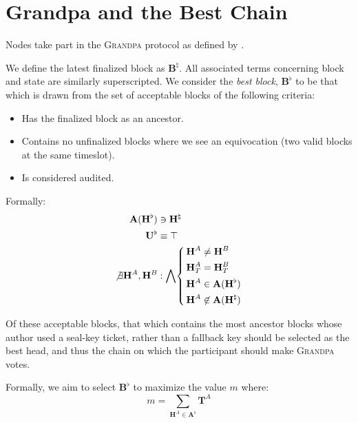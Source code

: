 \section{Grandpa and the Best Chain}\label{sec:bestchain}\label{sec:grandpa}

Nodes take part in the \textsc{Grandpa} protocol as defined by \cite{stewart2020grandpa}.

\newcommand{\final}{\natural}
\newcommand{\best}{\flat}

We define the latest finalized block as $\mathbf{B}^\final$. All associated terms concerning block and state are similarly superscripted. We consider the \emph{best block}, $\mathbf{B}^\best$ to be that which is drawn from the set of acceptable blocks of the following criteria:

\begin{itemize}
  \item Has the finalized block as an ancestor.
  \item Contains no unfinalized blocks where we see an equivocation (two valid blocks at the same timeslot).
  \item Is considered audited.
\end{itemize}

Formally:
\begin{align}
  \mathbf{A}(\mathbf{H}^\best) &\owns \mathbf{H}^\final \\
  \mathbf{U}^\best &\equiv \top \\
  \not\exists \mathbf{H}^A, \mathbf{H}^B &: \bigwedge \left\{\,\begin{aligned}
    \mathbf{H}^A &\ne \mathbf{H}^B \\
    \mathbf{H}^A_T &= \mathbf{H}^B_T \\
    \mathbf{H}^A &\in \mathbf{A}(\mathbf{H}^\best) \\
    \mathbf{H}^A &\not\in \mathbf{A}(\mathbf{H}^\final)
  \end{aligned}\right.
\end{align}

Of these acceptable blocks, that which contains the most ancestor blocks whose author used a seal-key ticket, rather than a fallback key should be selected as the best head, and thus the chain on which the participant should make \textsc{Grandpa} votes.

Formally, we aim to select $\mathbf{B}^\best$ to maximize the value $m$ where:
\begin{equation}
  m = \sum_{\mathbf{H}^A \in \mathbf{A}^\best} \mathbf{T}^A
\end{equation}
